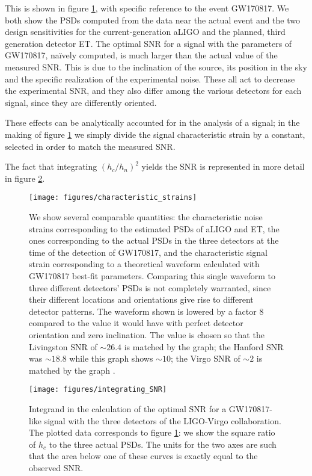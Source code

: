 \documentclass[main.tex]{subfiles}
\begin{document}
This is shown in figure \ref{fig:characteristic_strains}, with specific reference to the event GW170817. We both show the \acp{PSD} computed from the data near the actual event and the two design sensitivities for the current-generation \ac{aLIGO} and the planned, third generation detector \ac{ET}. 
The optimal \ac{SNR} for a signal with the parameters of GW170817, naïvely computed, is much larger than the actual value of the measured \ac{SNR}. This is due to the inclination of the source, its position in the sky and the specific realization of the experimental noise. 
These all act to decrease the experimental \ac{SNR}, and they also differ among the various detectors for each signal, since they are differently oriented. 

These effects can be analytically accounted for in the analysis of a signal; in the making of figure \ref{fig:characteristic_strains} we simply divide the signal characteristic strain by a constant, selected in order to match the measured \ac{SNR}. 

The fact that integrating \((h_c / h_n)^2\) yields the \ac{SNR} is represented in more detail in figure \ref{fig:integrating_SNR}.

\begin{figure}[t]
\centering
\texttt{[image: figures/characteristic\_strains]}
\caption{We show several comparable quantities: the characteristic noise strains corresponding to the estimated 
\acp{PSD} of \ac{aLIGO} and \ac{ET}, the ones corresponding to the actual \acp{PSD} in the three detectors at the time of the detection of GW170817, and the characteristic signal strain corresponding to a theoretical waveform calculated with GW170817 best-fit parameters. 
Comparing this single waveform to three different detectors' \acp{PSD} is not completely warranted, since their different locations and orientations give rise to different detector patterns.
The waveform shown is lowered by a factor \(8\) compared to the value it would have with perfect detector orientation and zero inclination. The value is chosen so that the Livingston \ac{SNR} of \(\sim 26.4\) is matched by the graph; the Hanford \ac{SNR} was \(\sim 18.8\) while this graph shows \(\sim 10\); the Virgo \ac{SNR} of \(\sim 2\) is matched by the graph \cite{abbottGW170817ObservationGravitational2017}.}
\label{fig:characteristic_strains}
\end{figure}

\begin{figure}[ht]
\centering
\texttt{[image: figures/integrating\_SNR]}
\caption{Integrand in the calculation of the optimal \ac{SNR} for a GW170817-like signal with the three detectors of the \ac{LIGO}-Virgo collaboration. The plotted data corresponds to figure \ref{fig:characteristic_strains}: we show the square ratio of \(h_c\) to the three actual \acp{PSD}. The units for the two axes are such that the area below one of these curves is exactly equal to the observed \ac{SNR}.}
\label{fig:integrating_SNR}
\end{figure}
\end{document}
